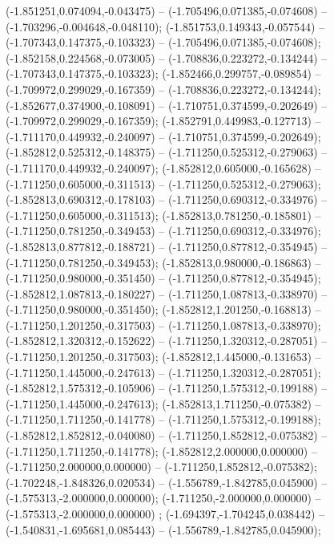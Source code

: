  (-1.851251,0.074094,-0.043475) -- (-1.705496,0.071385,-0.074608) -- (-1.703296,-0.004648,-0.048110);
 (-1.851753,0.149343,-0.057544) -- (-1.707343,0.147375,-0.103323) -- (-1.705496,0.071385,-0.074608);
 (-1.852158,0.224568,-0.073005) -- (-1.708836,0.223272,-0.134244) -- (-1.707343,0.147375,-0.103323);
 (-1.852466,0.299757,-0.089854) -- (-1.709972,0.299029,-0.167359) -- (-1.708836,0.223272,-0.134244);
 (-1.852677,0.374900,-0.108091) -- (-1.710751,0.374599,-0.202649) -- (-1.709972,0.299029,-0.167359);
 (-1.852791,0.449983,-0.127713) -- (-1.711170,0.449932,-0.240097) -- (-1.710751,0.374599,-0.202649);
 (-1.852812,0.525312,-0.148375) -- (-1.711250,0.525312,-0.279063) -- (-1.711170,0.449932,-0.240097);
 (-1.852812,0.605000,-0.165628) -- (-1.711250,0.605000,-0.311513) -- (-1.711250,0.525312,-0.279063);
 (-1.852813,0.690312,-0.178103) -- (-1.711250,0.690312,-0.334976) -- (-1.711250,0.605000,-0.311513);
 (-1.852813,0.781250,-0.185801) -- (-1.711250,0.781250,-0.349453) -- (-1.711250,0.690312,-0.334976);
 (-1.852813,0.877812,-0.188721) -- (-1.711250,0.877812,-0.354945) -- (-1.711250,0.781250,-0.349453);
 (-1.852813,0.980000,-0.186863) -- (-1.711250,0.980000,-0.351450) -- (-1.711250,0.877812,-0.354945);
 (-1.852812,1.087813,-0.180227) -- (-1.711250,1.087813,-0.338970) -- (-1.711250,0.980000,-0.351450);
 (-1.852812,1.201250,-0.168813) -- (-1.711250,1.201250,-0.317503) -- (-1.711250,1.087813,-0.338970);
 (-1.852812,1.320312,-0.152622) -- (-1.711250,1.320312,-0.287051) -- (-1.711250,1.201250,-0.317503);
 (-1.852812,1.445000,-0.131653) -- (-1.711250,1.445000,-0.247613) -- (-1.711250,1.320312,-0.287051);
 (-1.852812,1.575312,-0.105906) -- (-1.711250,1.575312,-0.199188) -- (-1.711250,1.445000,-0.247613);
 (-1.852813,1.711250,-0.075382) -- (-1.711250,1.711250,-0.141778) -- (-1.711250,1.575312,-0.199188);
 (-1.852812,1.852812,-0.040080) -- (-1.711250,1.852812,-0.075382) -- (-1.711250,1.711250,-0.141778);
 (-1.852812,2.000000,0.000000) -- (-1.711250,2.000000,0.000000) -- (-1.711250,1.852812,-0.075382);
 (-1.702248,-1.848326,0.020534) -- (-1.556789,-1.842785,0.045900) -- (-1.575313,-2.000000,0.000000);
 (-1.711250,-2.000000,0.000000) -- (-1.575313,-2.000000,0.000000) ;
 (-1.694397,-1.704245,0.038442) -- (-1.540831,-1.695681,0.085443) -- (-1.556789,-1.842785,0.045900);
